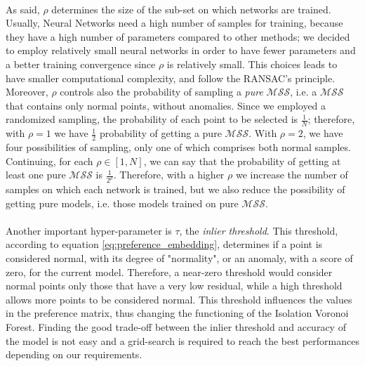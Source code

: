 \paragraph{}
As said, $\rho$ determines the size of the sub-set on which networks are trained. Usually, Neural Networks need a high number of samples for training, because they have a high number of parameters compared to other methods; we decided to employ relatively small neural networks in order to have fewer parameters and a better training convergence since $\rho$ is relatively small. This choices leads to have smaller computational complexity, and follow the RANSAC's principle. \newline
Moreover, $\rho$ controls also the probability of sampling a \textit{pure} $\mathcal{MSS}$, i.e. a $\mathcal{MSS}$ that contains only normal points, without anomalies. Since we employed a randomized sampling, the probability of each point to be selected is $\frac{1}{N}$; therefore, with $\rho = 1$ we have $\frac{1}{2}$ probability of getting a pure $\mathcal{MSS}$. With $\rho = 2$, we have four possibilities of sampling, only one of which comprises both normal samples. Continuing, for each $\rho \in [1, N]$, we can say that the probability of getting at least one pure $\mathcal{MSS}$ is $\displaystyle \frac{1}{2^\rho}$. Therefore, with a higher $\rho$ we increase the number of samples on which each network is trained, but we also reduce the possibility of getting pure models, i.e. those models trained on pure $\mathcal{MSS}$.

\paragraph{}
Another important hyper-parameter is $\tau$, the \textit{inlier threshold}. This threshold, according to equation \ref{eq:preference_embedding}, determines if a point is considered normal, with its degree of "normality", or an anomaly, with a score of zero, for the current model. Therefore, a near-zero threshold would consider normal points only those that have a very low residual, while a high threshold allows more points to be considered normal. \newline
This threshold influences the values in the preference matrix, thus changing the functioning of the Isolation Voronoi Forest. Finding the good trade-off between the inlier threshold and accuracy of the model is not easy and a grid-search is required to reach the best performances depending on our requirements. 

